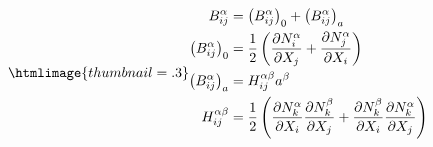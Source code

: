 \documentclass[a4paper,twoside]{article}
\renewcommand{\d}{\partial}\providecommand{\bm}[1]{\mathbf{#1}}
\begin{document}
\begin{flushright}
\begin{subequations}\htmlimage{thumbnail=.3}
\label{bgdefs}
\begin{align} B_{ij}^\alpha     & =
        \left(B_{ij}^\alpha\right)_0 + \left(B_{ij}^\alpha\right)_a \label{bdef}  \\
  \left(B_{ij}^\alpha\right)_0  & = \frac{1}{2}\left(\frac{\d N_i^\alpha}{\d X_j}
        + \frac{\d N_j^\alpha} {\d X_i} \right)                     \label{b0def} \\
  \left(B_{ij}^\alpha\right)_a  & = H_{ij}^{\alpha \beta} a^\beta   \label{budef} \\
  H_{ij}^{\alpha \beta}         & = 
    \frac{1}{2}\left( \frac{\d N_k^\alpha}{\d X_i} \frac{\d N_k^\beta}{\d X_j} 
    + \frac{\d N_k^\beta}{\d X_i} \frac{\d N_k^\alpha}{\d X_j} \right)  \label{gdef}
\end{align}
\end{subequations}
\end{flushright}
\end{document}
